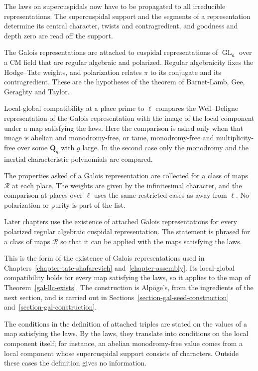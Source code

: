 The laws on supercuspidals now have to be propagated to all irreducible representations. The
supercuspidal support and the segments of a representation determine its central character, twists
and contragredient, and goodness and depth zero are read off the support.

The Galois representations are attached to cuspidal representations of $\operatorname{GL}_a$ over a
CM field that are regular algebraic and polarized. Regular algebraicity fixes the Hodge--Tate
weights, and polarization relates $\pi$ to its conjugate and its contragredient. These are the
hypotheses of the theorem of Barnet-Lamb, Gee, Geraghty and Taylor.

Local-global compatibility at a place prime to $\ell$ compares the Weil--Deligne representation of
the Galois representation with the image of the local component under a map satisfying the laws.
Here the comparison is asked only when that image is abelian and monodromy-free, or tame,
monodromy-free and multiplicity-free over some $\mathbf Q_g$ with $g$ large. In the second case only
the monodromy and the inertial characteristic polynomials are compared.

The properties asked of a Galois representation are collected for a class of maps $\mathcal R$ at
each place. The weights are given by the infinitesimal character, and the comparison at places over
$\ell$ uses the same restricted cases as away from $\ell$. No polarization or purity is part of the
list.

Later chapters use the existence of attached Galois representations for every polarized regular
algebraic cuspidal representation. The statement is phrased for a class of maps $\mathcal R$ so that
it can be applied with the maps satisfying the laws.

This is the form of the existence of Galois representations used in Chapters~\ref{chapter-tate-shafarevich}
and~\ref{chapter-assembly}. Its local-global compatibility holds for every map satisfying the laws,
so it applies to the map of Theorem~\ref{gal-llc-exists}. The construction is Alp\"oge's, from the
ingredients of the next section, and is carried out in Sections~\ref{section-gal-seed-construction}
and~\ref{section-gal-construction}.

The conditions in the definition of attached triples are stated on the values of a map satisfying
the laws. By the laws, they translate into conditions on the local component itself; for instance, an
abelian monodromy-free value comes from a local component whose supercuspidal support consists of
characters. Outside these cases the definition gives no information.


